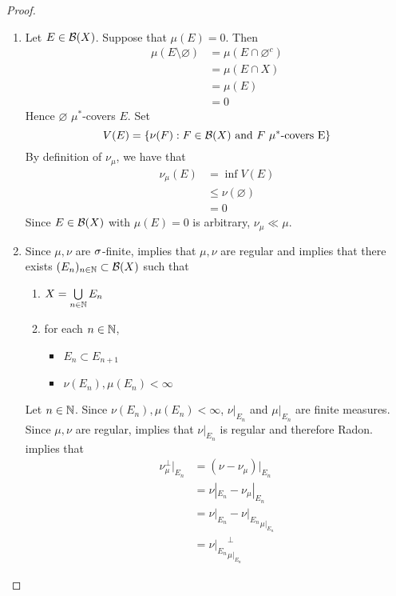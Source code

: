 \documentclass{book}
\begin{document}
	\begin{proof}\
		\begin{enumerate}
			\item Let $E \in \mathcal{B}(X)$. Suppose that $\mu(E) = 0$. Then 
			\begin{align*}
				\mu(E \setminus \varnothing)
				& = \mu(E \cap \varnothing^c) \\
				& = \mu(E \cap X) \\
				& = \mu(E) \\
				& = 0
			\end{align*}
			Hence $\varnothing$ $\mu^*$-covers $E$. Set 
			$$V(E) = \{\nu(F): F \in \mathcal{B}(X) \text{ and $F$ $\mu^*$-covers E}\}$$ 
			By definition of $\nu_{\mu}$, we have that 
			\begin{align*}
				\nu_{\mu}(E)
				& = \inf V(E) \\
				& \leq \nu(\varnothing) \\
				& = 0
			\end{align*}
			Since $E \in \mathcal{B}(X)$ with $\mu(E) = 0$ is arbitrary, $\nu_{\mu} \ll \mu$.
			\item Since $\mu,\nu$ are $\sigma$-finite,  implies that $\mu, \nu$ are regular and  implies that there exists $(E_n)_{n \in \mathbb{N}} \subset \mathcal{B}(X)$ such that 
			\begin{enumerate}
				\item $X = \bigcup\limits_{n \in \mathbb{N}} E_n$
				\item for each $n \in \mathbb{N}$,
				\begin{itemize}
					\item $E_n \subset E_{n+1}$ 
					\item $\nu(E_n), \mu(E_n) < \infty$
				\end{itemize}
			\end{enumerate} 
			Let $n \in \mathbb{N}$. Since $\nu(E_n), \mu(E_n) < \infty$, $\nu|_{E_n}$ and $\mu|_{E_n}$ are finite measures. Since $\mu,\nu$ are regular,  implies that $\nu|_{E_n}$ is regular and therefore Radon.   implies that 
			\begin{align*}
				\nu_{\mu}^{\perp}|_{E_n} 
				& = (\nu - \nu_{\mu})|_{E_n} \\
				& = \nu|_{E_n} - \nu_{\mu}|_{E_n} \\
				& = \nu|_{E_n} - {\nu|_{E_n}}_{\mu|_{E_n}} \\
				& = {\nu|_{E_n}}_{\mu|_{E_n}}^{\perp}
			\end{align*}

\end{enumerate}
\end{proof}
\end{document}
